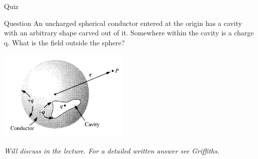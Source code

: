 %
%


{
\problemslide

%
%
%

\begin{frame}{Quiz}

\begin{blockexmplque}{Question}
 An uncharged spherical conductor entered at the origin has a cavity with an
 arbitrary shape carved  out of it. Somewhere within the cavity is a charge q.
 What is the field outside the sphere?\\
 \begin{center}
     \includegraphics[width=0.47\textwidth]{./images/problems/lect3_conductor_cavity.png}
 \end{center}
\end{blockexmplque}

\vspace{0.1cm}

{\small
\it Will discuss in the lecture. For a detailed written answer see Griffiths.
}

\end{frame}


} %



%
%
%

